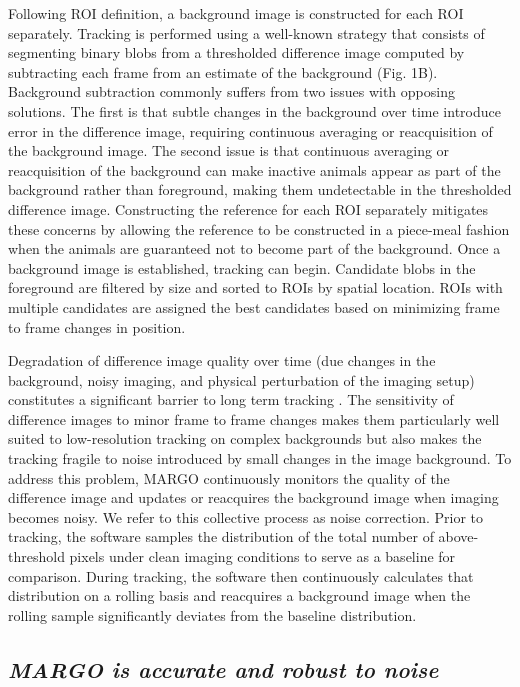 \documentclass[10pt]{article}
\begin{document}
\begin{multicols}{2}
Following ROI definition, a background image is constructed for each ROI separately. Tracking is performed using a well-known strategy that consists of segmenting binary blobs from a thresholded difference image computed by subtracting each frame from an estimate of the background (Fig. 1B). Background subtraction commonly suffers from two issues with opposing solutions. The first is that subtle changes in the background over time introduce error in the difference image, requiring continuous averaging or reacquisition of the background image. The second issue is that continuous averaging or reacquisition of the background can make inactive animals appear as part of the background rather than foreground, making them undetectable in the thresholded difference image. Constructing the reference for each ROI separately mitigates these concerns by allowing the reference to be constructed in a piece-meal fashion when the animals are guaranteed not to become part of the background. Once a background image is established, tracking can begin. Candidate blobs in the foreground are filtered by size and sorted to ROIs by spatial location. ROIs with multiple candidates are assigned the best candidates based on minimizing frame to frame changes in position.

Degradation of difference image quality over time (due changes in the background, noisy imaging, and physical perturbation of the imaging setup) constitutes a significant barrier to long term tracking \cite{Sridhar_Tracktor_2018}. The sensitivity of difference images to minor frame to frame changes makes them particularly well suited to low-resolution tracking on complex backgrounds \cite{Liu_A_2018} but also makes the tracking fragile to noise introduced by small changes in the image background. To address this problem, MARGO continuously monitors the quality of the difference image and updates or reacquires the background image when imaging becomes noisy. We refer to this collective process as noise correction. Prior to tracking, the software samples the distribution of the total number of above-threshold pixels under clean imaging conditions to serve as a baseline for comparison.  During tracking, the software then continuously calculates that distribution on a rolling basis and reacquires a background image when the rolling sample significantly deviates from the baseline distribution.

\subsection*{\textit{MARGO is accurate and robust to noise}}


\end{multicols}
\end{document}
